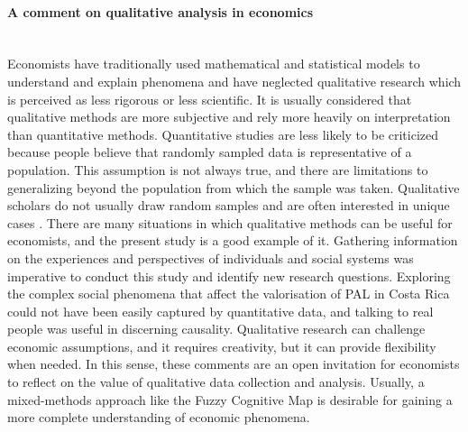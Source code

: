 \paragraph{A comment on qualitative analysis in economics} \mbox{}\\
Economists have traditionally used mathematical and statistical models to understand and explain phenomena and have neglected qualitative research which is perceived as less rigorous or less scientific. It is usually considered that qualitative methods are more subjective and rely more heavily on interpretation than quantitative methods. Quantitative studies are less likely to be criticized because people believe that randomly sampled data is representative of a population. This assumption is not always true, and there are limitations to generalizing beyond the population from which the sample was taken. Qualitative scholars do not usually draw random samples and are often interested in unique cases \citep{rubin2021rocking}. There are many situations in which qualitative methods can be useful for economists, and the present study is a good example of it. Gathering information on the experiences and perspectives of individuals and social systems was imperative to conduct this study and identify new research questions. Exploring the complex social phenomena that affect the valorisation of PAL in Costa Rica could not have been easily captured by quantitative data, and talking to real people was useful in discerning causality. Qualitative research can challenge economic assumptions, and it requires creativity, but it can provide flexibility when needed. In this sense, these comments are an open invitation for economists to reflect on the value of qualitative data collection and analysis. Usually, a mixed-methods approach like the Fuzzy Cognitive Map is desirable for gaining a more complete understanding of economic phenomena.


